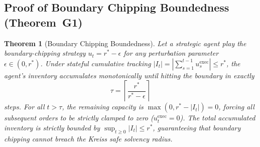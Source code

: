 \documentclass[11pt,a4paper]{article}
\newtheorem{theorem}{Theorem}[section]
\theoremstyle{definition}\newtheorem{definition}[theorem]{Definition}
\theoremstyle{remark}\newtheorem{remark}[theorem]{Remark}
\begin{document}
\subsection{Proof of Boundary Chipping Boundedness (Theorem~G1)}
\label{sec:supp_proof_g1}
\begin{theorem}[Boundary Chipping Boundedness]\label{thm:supp_g1}
Let a strategic agent play the boundary-chipping strategy $u_t = r^* - \epsilon$ for any perturbation parameter $\epsilon \in (0, r^*)$. Under stateful cumulative tracking $|I_t| = |\sum_{s=1}^{t-1} u_s^{\text{exec}}| \le r^*$, the agent's inventory accumulates monotonically until hitting the boundary in exactly
\begin{equation}
\tau = \left\lceil \frac{r^*}{r^* - \epsilon} \right\rceil
\end{equation}
steps. For all $t > \tau$, the remaining capacity is $\max(0, r^* - |I_t|) = 0$, forcing all subsequent orders to be strictly clamped to zero ($u_t^{\text{exec}} = 0$). The total accumulated inventory is strictly bounded by $\sup_{t \ge 0} |I_t| \le r^*$, guaranteeing that boundary chipping cannot breach the Kreiss safe solvency radius.
\end{theorem}
\end{document}
